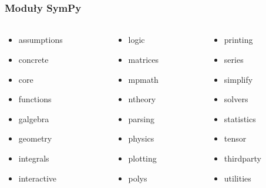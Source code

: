\documentclass[10pt]{beamer}
\begin{document}
\begin{frame}
    \frametitle{Moduły SymPy}
    \framesubtitle{}

    \begin{columns}
        \begin{column}[l]{0.3\textwidth}
            \begin{itemize}
                \item assumptions
                \item concrete
                \item core
                \item functions
                \item galgebra
                \item geometry
                \item integrals
                \item interactive
            \end{itemize}
        \end{column}
        \pause
        \begin{column}[l]{0.3\textwidth}
            \begin{itemize}
                \item logic
                \item matrices
                \item mpmath
                \item ntheory
                \item parsing
                \item physics
                \item plotting
                \item polys
            \end{itemize}
        \end{column}
        \pause
        \begin{column}[l]{0.3\textwidth}
            \begin{itemize}
                \item printing
                \item series
                \item simplify
                \item solvers
                \item statistics
                \item tensor
                \item thirdparty
                \item utilities
            \end{itemize}
        \end{column}
    \end{columns}
\end{frame}
\end{document}
